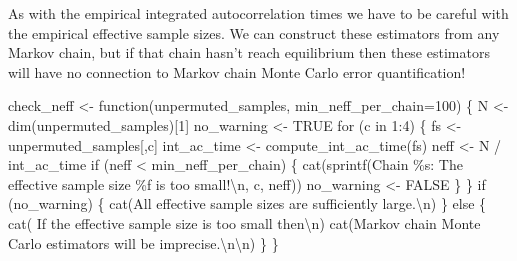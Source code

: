 \documentclass[
  letterpaper,
  DIV=11,
  numbers=noendperiod]{scrartcl}
\newenvironment{Shaded}{\begin{snugshade}}{\end{snugshade}}
\newcommand{\AttributeTok}[1]{\textcolor[rgb]{0.40,0.45,0.13}{#1}}
\newcommand{\ConstantTok}[1]{\textcolor[rgb]{0.56,0.35,0.01}{#1}}
\newcommand{\ControlFlowTok}[1]{\textcolor[rgb]{0.00,0.23,0.31}{#1}}
\newcommand{\DecValTok}[1]{\textcolor[rgb]{0.68,0.00,0.00}{#1}}
\newcommand{\FunctionTok}[1]{\textcolor[rgb]{0.28,0.35,0.67}{#1}}
\newcommand{\NormalTok}[1]{\textcolor[rgb]{0.00,0.23,0.31}{#1}}
\newcommand{\OtherTok}[1]{\textcolor[rgb]{0.00,0.23,0.31}{#1}}
\newcommand{\SpecialCharTok}[1]{\textcolor[rgb]{0.37,0.37,0.37}{#1}}
\newcommand{\StringTok}[1]{\textcolor[rgb]{0.13,0.47,0.30}{#1}}
\begin{document}
As with the empirical integrated autocorrelation times we have to be
careful with the empirical effective sample sizes. We can construct
these estimators from any Markov chain, but if that chain hasn't reach
equilibrium then these estimators will have no connection to Markov
chain Monte Carlo error quantification!

\begin{Shaded}
\begin{Highlighting}[]
\NormalTok{check\_neff }\OtherTok{\textless{}{-}} \ControlFlowTok{function}\NormalTok{(unpermuted\_samples,}
                       \AttributeTok{min\_neff\_per\_chain=}\DecValTok{100}\NormalTok{) \{}
\NormalTok{  N }\OtherTok{\textless{}{-}} \FunctionTok{dim}\NormalTok{(unpermuted\_samples)[}\DecValTok{1}\NormalTok{]}
\NormalTok{  no\_warning }\OtherTok{\textless{}{-}} \ConstantTok{TRUE}
  \ControlFlowTok{for}\NormalTok{ (c }\ControlFlowTok{in} \DecValTok{1}\SpecialCharTok{:}\DecValTok{4}\NormalTok{) \{}
\NormalTok{    fs }\OtherTok{\textless{}{-}}\NormalTok{ unpermuted\_samples[,c]}
\NormalTok{    int\_ac\_time }\OtherTok{\textless{}{-}} \FunctionTok{compute\_int\_ac\_time}\NormalTok{(fs)}
\NormalTok{    neff }\OtherTok{\textless{}{-}}\NormalTok{ N }\SpecialCharTok{/}\NormalTok{ int\_ac\_time}
    \ControlFlowTok{if}\NormalTok{ (neff }\SpecialCharTok{\textless{}}\NormalTok{ min\_neff\_per\_chain) \{}
      \FunctionTok{cat}\NormalTok{(}\FunctionTok{sprintf}\NormalTok{(}\StringTok{\textquotesingle{}Chain \%s: The effective sample size \%f is too small!}\SpecialCharTok{\textbackslash{}n}\StringTok{\textquotesingle{}}\NormalTok{,}
\NormalTok{                   c, neff))}
\NormalTok{      no\_warning }\OtherTok{\textless{}{-}} \ConstantTok{FALSE}
\NormalTok{    \}}
\NormalTok{  \}}
  \ControlFlowTok{if}\NormalTok{ (no\_warning) \{}
    \FunctionTok{cat}\NormalTok{(}\StringTok{\textquotesingle{}All effective sample sizes are sufficiently large.}\SpecialCharTok{\textbackslash{}n}\StringTok{\textquotesingle{}}\NormalTok{)}
\NormalTok{  \} }\ControlFlowTok{else}\NormalTok{ \{}
    \FunctionTok{cat}\NormalTok{(}\StringTok{\textquotesingle{}  If the effective sample size is too small then}\SpecialCharTok{\textbackslash{}n}\StringTok{\textquotesingle{}}\NormalTok{)}
    \FunctionTok{cat}\NormalTok{(}\StringTok{\textquotesingle{}Markov chain Monte Carlo estimators will be imprecise.}\SpecialCharTok{\textbackslash{}n\textbackslash{}n}\StringTok{\textquotesingle{}}\NormalTok{)}
\NormalTok{  \}}
\NormalTok{\}}
\end{Highlighting}
\end{Shaded}
\end{document}
